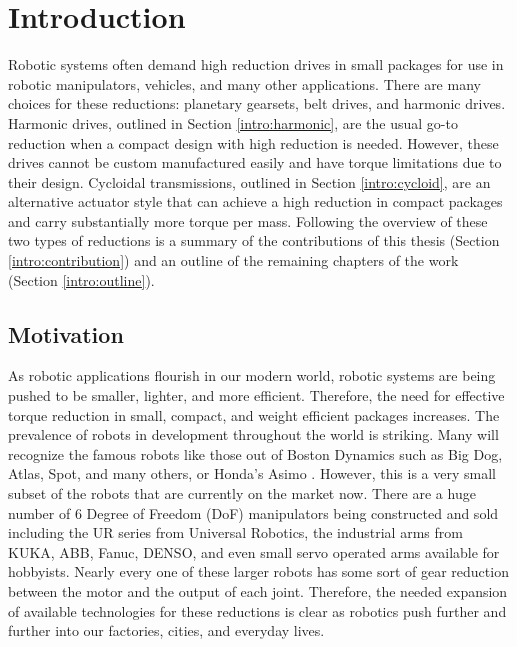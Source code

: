 
\chapter{Introduction}\label{ch:intro}
Robotic systems often demand high reduction drives in small packages for use in robotic manipulators, vehicles, and many other applications. There are many choices for these reductions: planetary gearsets, belt drives, and harmonic drives. Harmonic drives, outlined in Section \ref{intro:harmonic}, are the usual go-to reduction when a compact design with high reduction is needed. However, these drives cannot be custom manufactured easily and have torque limitations due to their design. Cycloidal transmissions, outlined in Section \ref{intro:cycloid}, are an alternative actuator style that can achieve a high reduction in compact packages and carry substantially more torque per mass. Following the overview of these two types of reductions is a summary of the contributions of this thesis (Section \ref{intro:contribution}) and an outline of the remaining chapters of the work (Section \ref{intro:outline}). 

\section{Motivation} \label{intro:motivation}

As robotic applications flourish in our modern world, robotic systems are being pushed to be smaller, lighter, and more efficient. 
Therefore, the need for effective torque reduction in small, compact, and weight efficient packages increases. 
The prevalence of robots in development throughout the world is striking. 
Many will recognize the famous robots like those out of Boston Dynamics such as Big Dog, Atlas, Spot, and many others, or Honda's Asimo \cite{ref:asimo}.
However, this is a very small subset of the robots that are currently on the market now. 
There are a huge number of 6 Degree of Freedom (DoF) manipulators being constructed and sold including the UR series from Universal Robotics, the industrial arms from KUKA, ABB, Fanuc, DENSO, and even small servo operated arms available for hobbyists. 
Nearly every one of these larger robots has some sort of gear reduction between the motor and the output of each joint. Therefore, the needed expansion of available technologies for these reductions is clear as robotics push further and further into our factories, cities, and everyday lives. 

